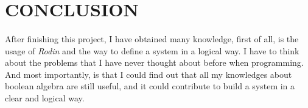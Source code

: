 \section{CONCLUSION}

\paragraph{}
After finishing this project, I have obtained many knowledge, first of all, is the usage of \textit{Rodin} and the way to define a system in a logical way. I have to think about the problems that I have never thought about before when programming. And most importantly, is that I could find out that all my knowledges about boolean algebra are still useful, and it could contribute to build a system in a clear and logical way.